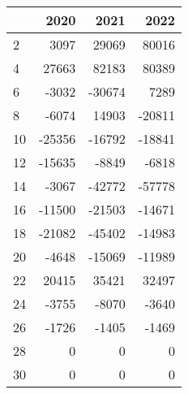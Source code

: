 \begin{tabular}{lrrr}
\toprule
{} &   2020 &   2021 &   2022 \\
\midrule
2  &   3097 &  29069 &  80016 \\
4  &  27663 &  82183 &  80389 \\
6  &  -3032 & -30674 &   7289 \\
8  &  -6074 &  14903 & -20811 \\
10 & -25356 & -16792 & -18841 \\
12 & -15635 &  -8849 &  -6818 \\
14 &  -3067 & -42772 & -57778 \\
16 & -11500 & -21503 & -14671 \\
18 & -21082 & -45402 & -14983 \\
20 &  -4648 & -15069 & -11989 \\
22 &  20415 &  35421 &  32497 \\
24 &  -3755 &  -8070 &  -3640 \\
26 &  -1726 &  -1405 &  -1469 \\
28 &      0 &      0 &      0 \\
30 &      0 &      0 &      0 \\
\bottomrule
\end{tabular}
